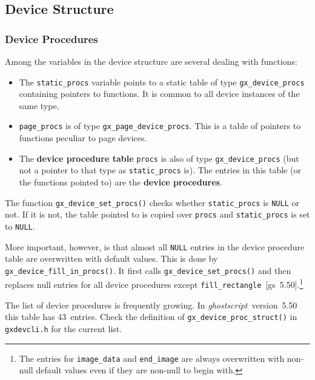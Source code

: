 \documentclass[twoside,a4paper]{article}
\newcommand{\gs}{\textit{ghostscript\/}}
\renewcommand{\d}[1]{{\bfseries #1}}	%
\newcommand{\prog}[1]{\texttt{#1}}
\newcommand{\file}[1]{\texttt{#1}}	%
\newif\ifdraft \draftfalse
\begin{document}

\subsection{Device Structure}

\ifdraft
??? Dynamic memory
\fi


\subsubsection{Device Procedures}

Among the variables in the device structure are several dealing with functions:
\begin{itemize}
  \item The \prog{static\_procs} variable points to a static table of
    type \prog{gx\_device\_procs} containing pointers to functions.
    It is common to all device instances of the same type.
  \item \prog{page\_procs} is of type \prog{gx\_page\_device\_procs}.
    This is a table of pointers to functions peculiar to page devices.
  \item The \d{device procedure table} \prog{procs} is also of
    type \prog{gx\_device\_procs}
    (but not a pointer to that type as \prog{static\_procs} is).
    The entries in this table (or the functions pointed to) are the
    \d{device procedures}.
\end{itemize}

The function \prog{gx\_device\_set\_procs()} checks whether
\prog{static\_procs} is \prog{NULL} or not.	%
If it is not,
the table pointed to is copied over \prog{procs} and
\prog{static\_procs} is set to \prog{NULL}.

More important, however, is that almost all \prog{NULL} entries in the
device procedure table are overwritten with default values.
This is done by \prog{gx\_device\_fill\_in\_procs()}.
It first calls \prog{gx\_device\_set\_procs()}
and then replaces null entries for all device procedures except
\prog{fill\_rectangle}~[gs~5.50].\footnote{
  The entries for \prog{image\_data} and \prog{end\_image} are always
  overwritten with non-null default values
  even if they are non-null to begin with.}

The list of device procedures is frequently growing.
In \gs\ version~5.50 this table has 43~entries.
Check the definition of \prog{gx\_device\_proc\_struct()} in \file{gxdevcli.h}
for the current list.
\end{document}
